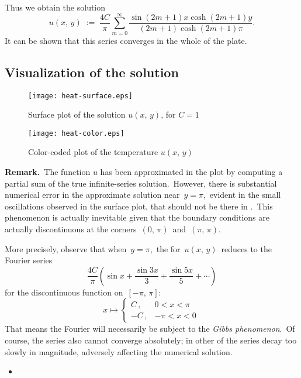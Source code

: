 \documentclass[12pt]{article}
\theoremstyle{definition}
\begin{document}
Thus we obtain the solution
$$u(x,\,y) \;:=\; 
\frac{4C}{\pi}\sum_{m=0}^\infty\frac{\sin(2m\!+\!1)x\cosh(2m\!+\!1)y}
                                    {(2m\!+\!1)\cosh(2m\!+\!1)\pi}.$$
It can be shown that this series converges in the whole  of the plate.

\subsection*{Visualization of the solution}

\begin{figure}[!htb]
\begin{center}
\texttt{[image: heat-surface.eps]}
\caption{Surface plot of the solution $u(x,\,y)$, for $C = 1$} 
\end{center}
\end{figure}

\begin{figure}[!htb]
\begin{center}
\texttt{[image: heat-color.eps]}
\caption{Color-coded plot of the temperature $u(x,\,y)$}
\end{center}
\end{figure}

\textbf{Remark.}\, The function $u$ has been approximated in the plot by computing a partial sum of the true infinite-series solution.\, However,
there is substantial numerical error in the approximate solution near\, 
$y = \pi$,\, evident in the small oscillations observed in the surface plot, that should not be there in .\, This phenomenon is actually inevitable given that the boundary conditions are actually discontinuous at the corners\, $(0,\,\pi)$\, and\, $(\pi,\,\pi)$.

More precisely, observe that when\, $y = \pi$,\, the  for\, $u(x,\,y)$\, reduces to the Fourier series
\[
\frac{4C}{\pi} \left( \sin{x}+\frac{\sin{3x}}{3}+\frac{\sin{5x}}{5}+\dotsb \right)
\]
for the discontinuous function on\, $[-\pi,\,\pi]$:
\[
x \mapsto \begin{cases}
 C\,, & 0 < x < \pi \\
 -C\,, & -\pi < x < 0
\end{cases}\,
\]
That means the Fourier  will necessarily be subject to the {\em Gibbs phenomenon}.\, Of course, the series also cannot converge absolutely; in other  of the series decay too slowly in magnitude, adversely affecting the numerical solution.

\begin{itemize}
\item
{}
\end{itemize}

\end{document}

